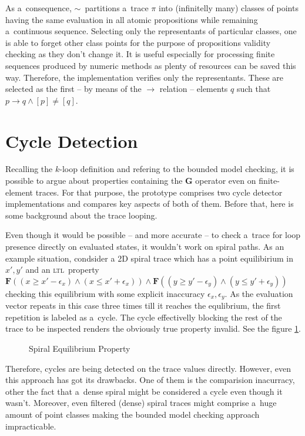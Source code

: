 \documentclass[12pt,oneside,draft]{fithesis}
\newcommand{\ltl}{\textsc{ltl}~}
\newcommand{\bF}{\mathbf{F}}
\newcommand{\bG}{\mathbf{G}}
\begin{document}
As a~consequence, $\sim$~partitions a~trace $\pi$ into
(infinitelly many) classes of points having the same evaluation in all
atomic propositions while remaining a~continuous sequence. Selecting
only the representants of particular classes, one is able to forget
other class points for the purpose of propositions validity checking
as they don't change it. It is useful especially for processing
finite sequences produced by numeric methods as plenty of resources can
be saved this way. Therefore, the implementation verifies only the
representants. These are selected as the first -- by means of
the $\rightarrow$ relation -- elements $q$ such that
$p\rightarrow q\wedge[p]\neq[q]$.

\section{Cycle Detection}
Recalling the $k$-loop definition and refering to the bounded model
checking, it is possible to argue about properties containing the $\bG$
operator even on finite-element traces\cite{biere}. For that purpose,
the prototype comprises two cycle detector implementations and compares
key aspects of both of them. Before that, here is some background about
the trace looping.

Even though it would be possible -- and more accurate -- to check
a~trace for loop presence directly on evaluated states, it wouldn't
work on spiral paths. As an example situation, condsider a 2D spiral
trace which has a point equilibirium in $x',y'$ and an \ltl property
$\bF((x\ge x'-\epsilon_x)\wedge(x\le x'+\epsilon_x))\wedge
\bF((y\ge y'-\epsilon_y)\wedge(y\le y'+\epsilon_y))$ checking this
equilibrium with some explicit inaccuracy $\epsilon_x,\epsilon_y$.
As the evaluation vector repeats in this case three times till
it reaches the equlibrium, the first repetition is labeled as a~cycle.
The cycle effectivelly blocking the rest of the trace to be inspected
renders the obviously true property invalid. See the
figure \ref{spiral}.
\begin{figure}

\caption{Spiral Equilibrium Property}
\label{spiral}
\end{figure}
Therefore, cycles are being detected on the trace values directly.
However, even this approach has got its drawbacks. One of them
is the comparision inacurracy, other the fact that a~dense spiral might
be considered a cycle even though it wasn't. Moreover, even filtered
(dense) spiral traces might comprise a~huge amount of point classes
making the bounded model checking approach impracticable.
\end{document}
